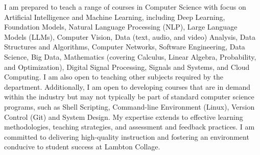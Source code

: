 \documentclass[11pt]{article}
\def\youruniversity{Lambton Collage}
\begin{document}



I am prepared to teach a range of courses in Computer Science with focus on Artificial Intelligence and Machine Learning, including Deep Learning, Foundation Models, Natural Language Processing (NLP), Large Language Models (LLMs), Computer Vision, Data (text, audio, and video) Analysis, Data Structures and Algorithms, Computer Networks, Software Engineering, Data Science, Big Data, Mathematics (covering Calculus, Linear Algebra, Probability, and Optimization), Digital Signal Processing, Signals and Systems, and Cloud Computing. I am also open to teaching other subjects required by the department. Additionally, I am open to developing courses that are in demand within the industry but may not typically be part of standard computer science programs, such as Shell Scripting, Command-line Environment (Linux), Version Control (Git) and System Design.
My expertise extends to effective learning methodologies, teaching strategies, and assessment and feedback practices. I am committed to delivering high-quality instruction and fostering an environment conducive to student success at \youruniversity. %
\end{document}
